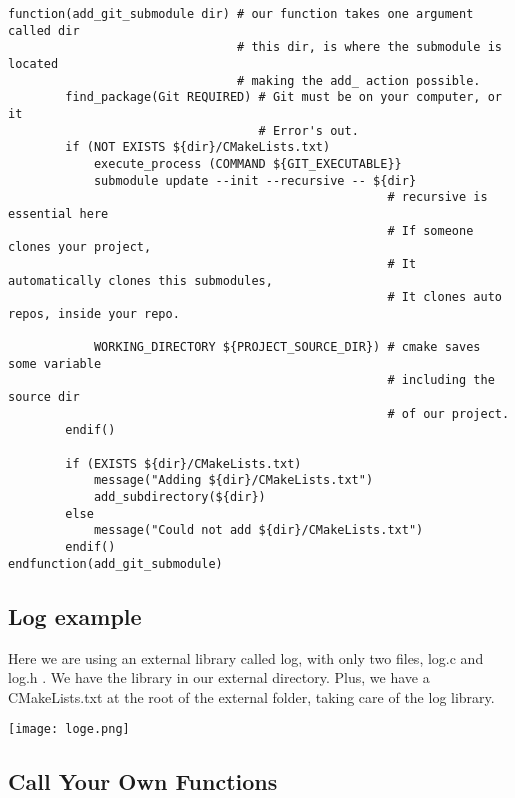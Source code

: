 \documentclass[openany]{report}
\begin{document}
\begin{verbatim}
function(add_git_submodule dir) # our function takes one argument called dir
                                # this dir, is where the submodule is located
                                # making the add_ action possible.
        find_package(Git REQUIRED) # Git must be on your computer, or it
                                   # Error's out.
        if (NOT EXISTS ${dir}/CMakeLists.txt)
            execute_process (COMMAND ${GIT_EXECUTABLE}}
            submodule update --init --recursive -- ${dir}
                                                     # recursive is essential here
                                                     # If someone clones your project, 
                                                     # It automatically clones this submodules,
                                                     # It clones auto repos, inside your repo.
                                                            
            WORKING_DIRECTORY ${PROJECT_SOURCE_DIR}) # cmake saves some variable
                                                     # including the source dir
                                                     # of our project.
        endif()
        
        if (EXISTS ${dir}/CMakeLists.txt)
            message("Adding ${dir}/CMakeLists.txt")
            add_subdirectory(${dir})
        else
            message("Could not add ${dir}/CMakeLists.txt")
        endif()
endfunction(add_git_submodule)
\end{verbatim}


\subsection{Log example}

Here we are using an external library called log, with only two files, log.c and log.h . We have the library in our 
external directory. Plus, we have a CMakeLists.txt at the root of the external folder, taking care of the log library. 


\begin{center}
    \texttt{[image: loge.png]}
\end{center}



\subsection{Call Your Own Functions}
\end{document}
